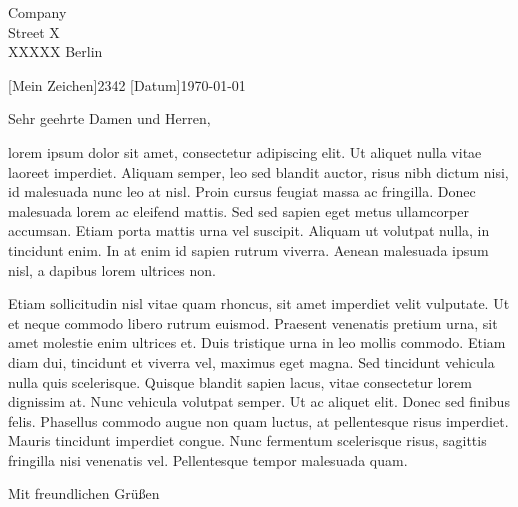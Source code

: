 \documentclass[briefvorlage,
   parskip=half,%
   fromfax=on,%
   fromemail=on,%
   locfield=wide,%
   draft=false%
]{scrlttr2}
\begin{document}
 \begin{letter}{
Company\\
Street X\\
XXXXX Berlin}


[\normalfont Mein Zeichen]{2342}
[\normalfont Datum]{\today}
\opening{Sehr geehrte Damen und Herren,}

lorem ipsum dolor sit amet, consectetur adipiscing elit. Ut aliquet nulla vitae laoreet imperdiet. Aliquam semper, leo sed blandit auctor, risus nibh dictum nisi, id malesuada nunc leo at nisl. Proin cursus feugiat massa ac fringilla. Donec malesuada lorem ac eleifend mattis. Sed sed sapien eget metus ullamcorper accumsan. Etiam porta mattis urna vel suscipit. Aliquam ut volutpat nulla, in tincidunt enim. In at enim id sapien rutrum viverra. Aenean malesuada ipsum nisl, a dapibus lorem ultrices non.

Etiam sollicitudin nisl vitae quam rhoncus, sit amet imperdiet velit vulputate. Ut et neque commodo libero rutrum euismod. Praesent venenatis pretium urna, sit amet molestie enim ultrices et. Duis tristique urna in leo mollis commodo. Etiam diam dui, tincidunt et viverra vel, maximus eget magna. Sed tincidunt vehicula nulla quis scelerisque. Quisque blandit sapien lacus, vitae consectetur lorem dignissim at. Nunc vehicula volutpat semper. Ut ac aliquet elit. Donec sed finibus felis. Phasellus commodo augue non quam luctus, at pellentesque risus imperdiet. Mauris tincidunt imperdiet congue. Nunc fermentum scelerisque risus, sagittis fringilla nisi venenatis vel. Pellentesque tempor malesuada quam.


\closing{Mit freundlichen Grüßen}
\end{letter}

 
\end{document}
